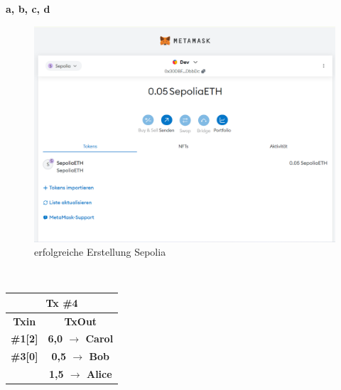 \documentclass[german]{../uebung}
\begin{document}
\begin{exercise}{1}

\end{exercise}

\begin{exercise}{2}
    \textbf{a, b, c, d}
    \begin{figure}[h]
        \centering
        \includegraphics*[scale=.5]{Sepolia.png}
        \caption{erfolgreiche Erstellung Sepolia}
    \end{figure}\\
\end{exercise}

\begin{exercise}{3}
    \begin{tabular}{|c|c|}
        \hline
        \multicolumn{2}{|c|}{\textbf{Tx \#4}}              \\
        \hline
        \textbf{Txin}   & \textbf{TxOut}                   \\
        \textbf{\#1[2]} & \textbf{6,0 $\rightarrow$ Carol} \\
        \textbf{\#3[0]} & \textbf{0,5 $\rightarrow$ Bob}   \\
        \textbf{}       & \textbf{1,5 $\rightarrow$ Alice} \\
        \hline
    \end{tabular}
\end{exercise}
\end{document}
